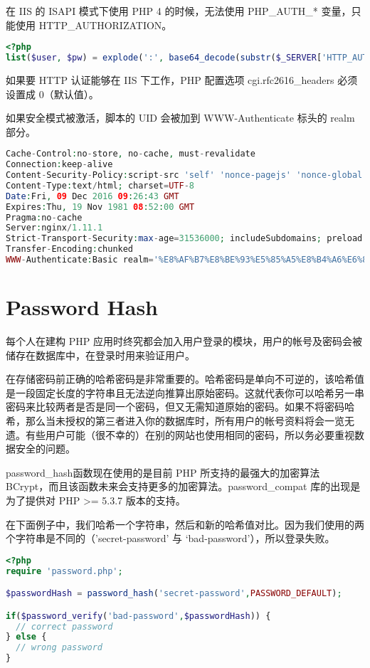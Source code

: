 在 IIS 的 ISAPI 模式下使用 PHP 4 的时候，无法使用 PHP\_AUTH\_* 变量，只能使用 HTTP\_AUTHORIZATION。

\begin{lstlisting}[language=PHP]
<?php
list($user, $pw) = explode(':', base64_decode(substr($_SERVER['HTTP_AUTHORIZATION'], 6)));。
\end{lstlisting}


如果要 HTTP 认证能够在 IIS 下工作，PHP 配置选项 cgi.rfc2616\_headers 必须设置成 0（默认值）。

如果安全模式被激活，脚本的 UID 会被加到 WWW-Authenticate 标头的 realm 部分。

\begin{lstlisting}[language=PHP]
Cache-Control:no-store, no-cache, must-revalidate
Connection:keep-alive
Content-Security-Policy:script-src 'self' 'nonce-pagejs' 'nonce-global' 'unsafe-inline' 'unsafe-eval'
Content-Type:text/html; charset=UTF-8
Date:Fri, 09 Dec 2016 09:26:43 GMT
Expires:Thu, 19 Nov 1981 08:52:00 GMT
Pragma:no-cache
Server:nginx/1.11.1
Strict-Transport-Security:max-age=31536000; includeSubdomains; preload
Transfer-Encoding:chunked
WWW-Authenticate:Basic realm='%E8%AF%B7%E8%BE%93%E5%85%A5%E8%B4%A6%E6%88%B7%E5%AF%86%E7%A0%81'
\end{lstlisting}

\section{Password Hash}

每个人在建构 PHP 应用时终究都会加入用户登录的模块，用户的帐号及密码会被储存在数据库中，在登录时用来验证用户。

在存储密码前正确的哈希密码是非常重要的。哈希密码是单向不可逆的，该哈希值是一段固定长度的字符串且无法逆向推算出原始密码。这就代表你可以哈希另一串密码来比较两者是否是同一个密码，但又无需知道原始的密码。如果不将密码哈希，那么当未授权的第三者进入你的数据库时，所有用户的帐号资料将会一览无遗。有些用户可能（很不幸的）在别的网站也使用相同的密码，所以务必要重视数据安全的问题。

password\_hash函数现在使用的是目前 PHP 所支持的最强大的加密算法 BCrypt，而且该函数未来会支持更多的加密算法。password\_compat 库的出现是为了提供对 PHP >= 5.3.7 版本的支持。

在下面例子中，我们哈希一个字符串，然后和新的哈希值对比。因为我们使用的两个字符串是不同的（’secret-password’ 与 ‘bad-password’），所以登录失败。

\begin{lstlisting}[language=PHP]
<?php 
require 'password.php';

$passwordHash = password_hash('secret-password',PASSWORD_DEFAULT);

if($password_verify('bad-password',$passwordHash)) {
  // correct password
} else {
  // wrong password
}
\end{lstlisting}



